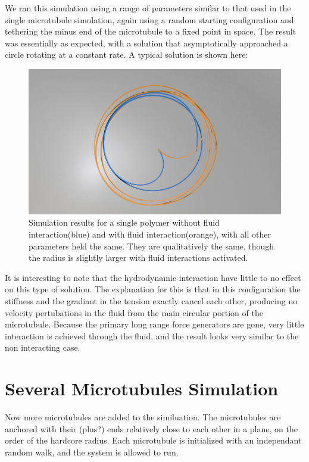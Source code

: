 \documentclass[11pt]{ucthesis}
\begin{document}
We ran this simulation using a range of parameters similar to that used in the single microtubule simulation, again using a random starting configuration and tethering the minus end of the microtubule to a fixed point in space. 
The result was essentially as expected, with a solution that asymptotically approached a circle rotating at a constant rate. A typical solution is shown here:

\begin{figure}[htp]
\begin{center}
\includegraphics[width=\hsize]{singtest.png}
\caption{ 
Simulation results for a single polymer without fluid interaction(blue) and with fluid interaction(orange), with all other parameters held the same. They are qualitatively the same, though the radius is slightly larger with fluid interactions activated.
}
\label{fig:singtest}
\end{center}
\end{figure}

It is interesting to note that the hydrodynamic interaction have little to no effect on this type of solution. 
The explanation for this is that in this configuration the stiffness and the gradiant in the tension exactly cancel each other, producing no velocity pertubations in the fluid from the main circular portion of the microtubule.
Because the primary long range force generators are gone, very little interaction is achieved through the fluid, and the result looks very similar to the non interacting case.

\section{Several Microtubules Simulation}
Now more microtubules are added to the similuation. The microtubules are anchored with their (plus?) ends relatively close to each other in a plane, on the order of the hardcore radius. 
Each microtubule is initialized with an independant random walk, and the system is allowed to run.
\end{document}
